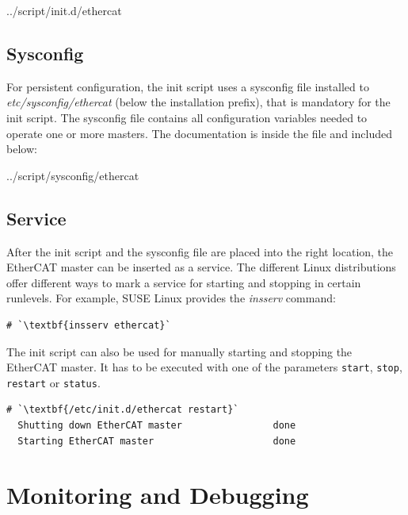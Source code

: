 \documentclass[a4paper,12pt,BCOR6mm,bibtotoc,idxtotoc]{scrbook}
\begin{document}

    {../script/init.d/ethercat}

\subsection{Sysconfig}
\label{sec:sysconfig}

For persistent configuration, the init script uses a sysconfig file installed
to \textit{etc/sysconfig/ethercat} (below the installation prefix), that is
mandatory for the init script. The sysconfig file contains all configuration
variables needed to operate one or more masters. The documentation is inside
the file and included below:


    {../script/sysconfig/ethercat}

\subsection{Service}
\label{sec:service}

After the init script and the sysconfig file are placed into the right
location, the EtherCAT master can be inserted as a service. The different Linux
distributions offer different ways to mark a service for starting and stopping
in certain runlevels. For example, SUSE Linux provides the \textit{insserv}
command:

\begin{lstlisting}
# `\textbf{insserv ethercat}`
\end{lstlisting}

The init script can also be used for manually starting and stopping
the EtherCAT master. It has to be executed with one of the parameters
\texttt{start}, \texttt{stop}, \texttt{restart} or \texttt{status}.

\begin{lstlisting}[gobble=2]
  # `\textbf{/etc/init.d/ethercat restart}`
  Shutting down EtherCAT master                done
  Starting EtherCAT master                     done
\end{lstlisting}


\section{Monitoring and Debugging}
\label{sec:debug}
\end{document}
